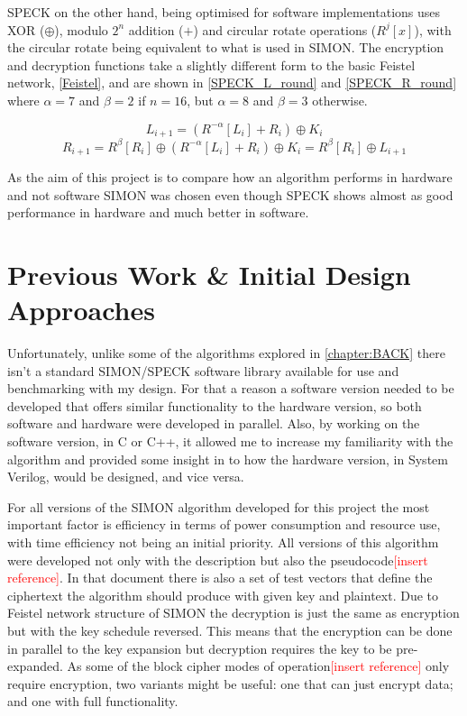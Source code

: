 \documentclass[12pt,twoside,a4paper]{report}
\begin{document}
	SPECK on the other hand, being optimised for software implementations uses XOR ($\oplus$), modulo $2^n$ addition ($+$) and circular rotate operations ($R^j[x]$), with the circular rotate being equivalent to what is used in SIMON. The encryption and decryption functions take a slightly different form to the basic Feistel network, \autoref{Feistel}, and are shown in \autoref{SPECK_L_round} and \ref{SPECK_R_round} where $\alpha = 7$ and $\beta = 2$ if $n = 16$, but $\alpha = 8$ and $\beta = 3$ otherwise.
    
	\begin{equation}
	\label{SPECK_L_round}
	L_{i+1} = (R^{-\alpha}[L_i] + R_i) \oplus K_i
	\end{equation}
	\begin{equation}
	\label{SPECK_R_round}
	R_{i+1} = R^{\beta}[R_i] \oplus (R^{-\alpha}[L_i] + R_i) \oplus K_i = R^{\beta}[R_i] \oplus L_{i+1}
	\end{equation}
	
	As the aim of this project is to compare how an algorithm performs in hardware and not software SIMON was chosen even though SPECK shows almost as good performance in hardware and much better in software. 
    
	\chapter{Previous Work \& Initial Design Approaches}
	\label{chapter:INITIAL}
	Unfortunately, unlike some of the algorithms explored in \autoref{chapter:BACK} there isn't a standard SIMON/SPECK software library available for use and benchmarking with my design. For that a reason a software version needed to be developed that offers similar functionality to the hardware version, so both software and hardware were developed in parallel. Also, by working on the software version, in C or C++, it allowed me to increase my familiarity with the algorithm and provided some insight in to how the hardware version, in System Verilog, would be designed, and vice versa.
    
	For all versions of the SIMON algorithm developed for this project the most important factor is efficiency in terms of power consumption and resource use, with time efficiency not being an initial priority. All versions of this algorithm were developed not only with the description but also the pseudocode\textcolor{red}{[insert reference]}. In that document there is also a set of test vectors that define the ciphertext the algorithm should produce with given key and plaintext. Due to Feistel network structure of SIMON the decryption is just the same as encryption but with the key schedule reversed. This means that the encryption can be done in parallel to the key expansion but decryption requires the key to be pre-expanded. As some of the block cipher modes of operation\textcolor{red}{[insert reference]} only require encryption, two variants might be useful: one that can just encrypt data; and one with full functionality.
    
\end{document}
